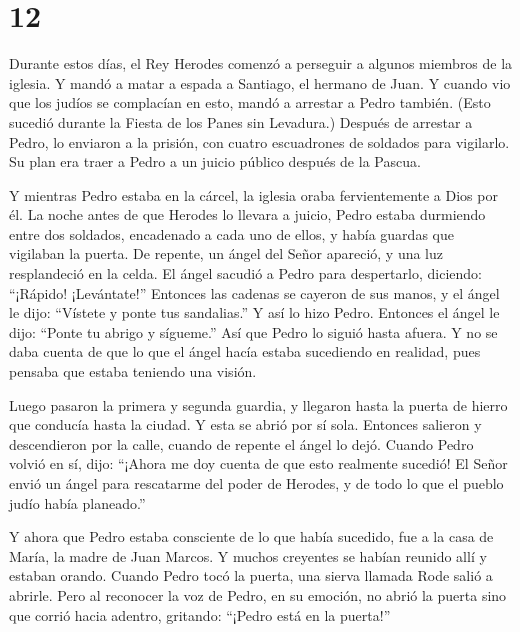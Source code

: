 \hypertarget{section-11}{%
\section{12}\label{section-11}}

 Durante estos días, el Rey Herodes comenzó a perseguir a
algunos miembros de la iglesia.  Y mandó a matar a espada a
Santiago, el hermano de Juan.  Y cuando vio que los judíos
se complacían en esto, mandó a arrestar a Pedro también. (Esto sucedió
durante la Fiesta de los Panes sin Levadura.)  Después de
arrestar a Pedro, lo enviaron a la prisión, con cuatro escuadrones de
soldados para vigilarlo. Su plan era traer a Pedro a un juicio público
después de la Pascua.

 Y mientras Pedro estaba en la cárcel, la iglesia oraba
fervientemente a Dios por él.  La noche antes de que Herodes
lo llevara a juicio, Pedro estaba durmiendo entre dos soldados,
encadenado a cada uno de ellos, y había guardas que vigilaban la puerta.
 De repente, un ángel del Señor apareció, y una luz
resplandeció en la celda. El ángel sacudió a Pedro para despertarlo,
diciendo: ``¡Rápido! ¡Levántate!'' Entonces las cadenas se cayeron de
sus manos,  y el ángel le dijo: ``Vístete y ponte tus
sandalias.'' Y así lo hizo Pedro. Entonces el ángel le dijo: ``Ponte tu
abrigo y sígueme.''  Así que Pedro lo siguió hasta afuera. Y
no se daba cuenta de que lo que el ángel hacía estaba sucediendo en
realidad, pues pensaba que estaba teniendo una visión.

 Luego pasaron la primera y segunda guardia, y llegaron
hasta la puerta de hierro que conducía hasta la ciudad. Y esta se abrió
por sí sola. Entonces salieron y descendieron por la calle, cuando de
repente el ángel lo dejó.  Cuando Pedro volvió en sí, dijo:
``¡Ahora me doy cuenta de que esto realmente sucedió! El Señor envió un
ángel para rescatarme del poder de Herodes, y de todo lo que el pueblo
judío había planeado.''

 Y ahora que Pedro estaba consciente de lo que había
sucedido, fue a la casa de María, la madre de Juan Marcos. Y muchos
creyentes se habían reunido allí y estaban orando.  Cuando
Pedro tocó la puerta, una sierva llamada Rode salió a abrirle.
 Pero al reconocer la voz de Pedro, en su emoción, no abrió
la puerta sino que corrió hacia adentro, gritando: ``¡Pedro está en la
puerta!''

